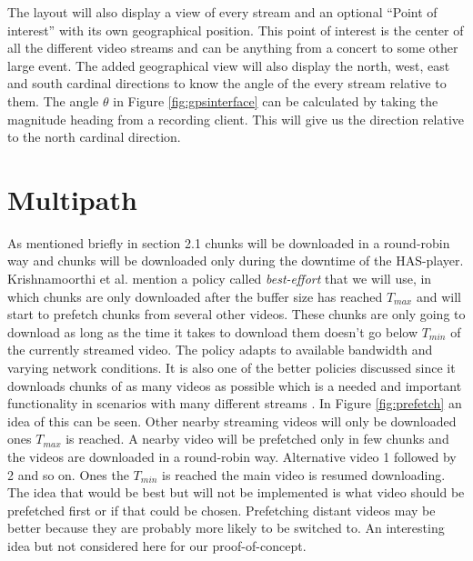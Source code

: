 The layout will also display a view of every stream and an optional “Point of interest” with its own geographical position. This point of interest is the center of all the different video streams and can be anything from a concert to some other large event. The added geographical view will also display the north, west, east and south cardinal directions to know the angle of the every stream relative to them. The angle $\theta$ in Figure \ref{fig:gpsinterface} can be calculated by taking the magnitude heading from a recording client. This will give us the direction relative to the north cardinal direction.

\section{Multipath}
\label{sec:multipath}

As mentioned briefly in section 2.1 chunks will be downloaded in a round-robin way and chunks will be downloaded only during the downtime of the HAS-player. Krishnamoorthi et al. \cite{bandawarePrefetch} mention a policy called \textit{best-effort} that we will use, in which chunks are only downloaded after the buffer size has reached $T_{max}$ and will start to prefetch chunks from several other videos. These chunks are only going to download as long as the time it takes to download them doesn't go below $T_{min}$ of the currently streamed video. The policy adapts to available bandwidth and varying network conditions. It is also one of the better policies discussed since it downloads chunks of as many videos as possible which is a needed and important functionality in  scenarios with many different streams \cite{bandawarePrefetch}. In Figure \ref{fig:prefetch} an idea of this can be seen. Other nearby streaming videos will only be downloaded ones $T_{max}$ is reached. A nearby video will be prefetched only in few chunks and the videos are downloaded in a round-robin way. Alternative video 1 followed by 2 and so on. Ones the $T_{min}$ is reached the main video is resumed downloading. The idea that would be best but will not be implemented is what video should be prefetched first or if that could be chosen. Prefetching distant videos may be better because they are probably more likely to be switched to. An interesting idea but not considered here for our proof-of-concept.

